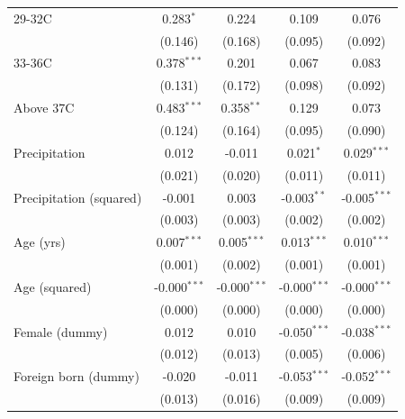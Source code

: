 \documentclass[12pt]{article}
\newcommand{\sym}[1]{\ensuremath{^{#1}}}
\begin{document}
\begin{appendices}
\begin{table}[h!]
\begin{tabular}{l*{4}{c}}
29-32C              &       0.283\sym{*}  &       0.224         &       0.109         &       0.076         \\
                    &     (0.146)         &     (0.168)         &     (0.095)         &     (0.092)         \\
33-36C              &       0.378\sym{***}&       0.201         &       0.067         &       0.083         \\
                    &     (0.131)         &     (0.172)         &     (0.098)         &     (0.092)         \\
Above 37C           &       0.483\sym{***}&       0.358\sym{**} &       0.129         &       0.073         \\
                    &     (0.124)         &     (0.164)         &     (0.095)         &     (0.090)         \\
Precipitation       &       0.012         &      -0.011         &       0.021\sym{*}  &       0.029\sym{***}\\
                    &     (0.021)         &     (0.020)         &     (0.011)         &     (0.011)         \\
Precipitation (squared)&      -0.001         &       0.003         &      -0.003\sym{**} &      -0.005\sym{***}\\
                    &     (0.003)         &     (0.003)         &     (0.002)         &     (0.002)         \\
Age (yrs)           &       0.007\sym{***}&       0.005\sym{***}&       0.013\sym{***}&       0.010\sym{***}\\
                    &     (0.001)         &     (0.002)         &     (0.001)         &     (0.001)         \\
Age (squared)       &      -0.000\sym{***}&      -0.000\sym{***}&      -0.000\sym{***}&      -0.000\sym{***}\\
                    &     (0.000)         &     (0.000)         &     (0.000)         &     (0.000)         \\
Female (dummy)      &       0.012         &       0.010         &      -0.050\sym{***}&      -0.038\sym{***}\\
                    &     (0.012)         &     (0.013)         &     (0.005)         &     (0.006)         \\
Foreign born (dummy)&      -0.020         &      -0.011         &      -0.053\sym{***}&      -0.052\sym{***}\\
                    &     (0.013)         &     (0.016)         &     (0.009)         &     (0.009)         \\

\end{tabular}
\end{table}
\end{appendices}
\end{document}
